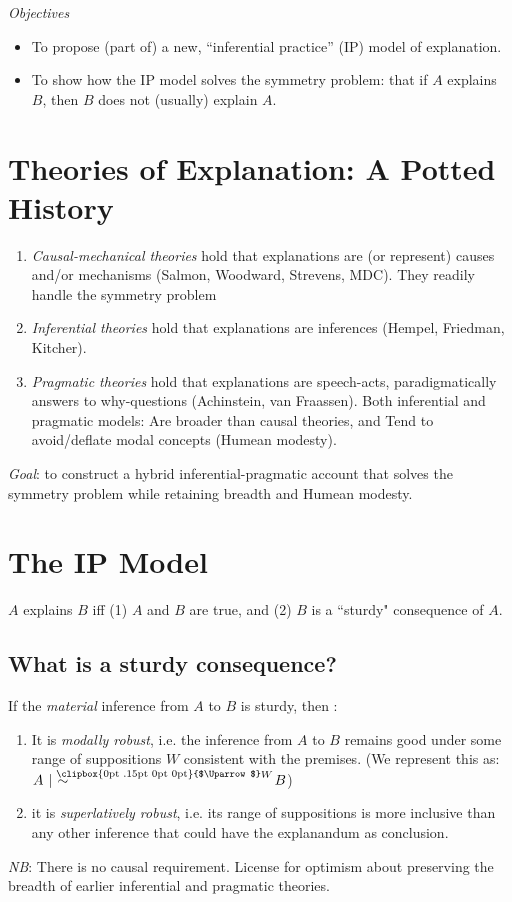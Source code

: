 \documentclass[11pt]{article}
\makeatletter
\newcommand{\Uuparrow}{%
	\raisebox{.2ex}{\clipbox{0pt .15pt 0pt 0pt}{$\Uparrow$}}
}
\newcommand{\nms}{%
	\mathbin{\mathpalette\@nms\expandafter}
}
\newcommand{\@nms}{\mid\joinrel\mkern-.5mu\sim}
\newcommand{\mrc}[1]{\mathbin{
		\mathchoice
		{\normalsize\hspace{.5mm}\nms^{\mkern-19mu\scriptsize\Uuparrow#1}\hspace{-.5mm}}
		{\normalsize\hspace{.5mm}\nms^{\mkern-19mu\scriptsize\Uuparrow#1}\hspace{-.5mm}}
		{\footnotesize\hspace{.5mm}\nms^{\mkern-13.5mu\fontsize{5.5}{0}\Uuparrow#1}}
		{\scriptsize\nms^{\mkern-10mu\tiny\Uuparrow#1}}
	}
}
\makeatother
\begin{document}
\textit{Objectives}
\begin{itemize}
\item To propose (part of) a new, ``inferential practice” (IP) model of explanation.
\item To show how the IP model solves the symmetry problem: that if $A$ explains $B$, then $B$ does not (usually) explain $A$.
\end{itemize}

\section{Theories of Explanation: A Potted History}
\begin{enumerate}
\item \textit{Causal-mechanical theories} hold that explanations are (or represent) causes and/or mechanisms (Salmon, Woodward, Strevens, MDC).
\subitem They readily handle the symmetry problem
\item \textit{Inferential theories} hold that explanations are inferences (Hempel, Friedman, Kitcher).
\item \textit{Pragmatic theories} hold that explanations are speech-acts, paradigmatically answers to why-questions (Achinstein, van Fraassen). Both inferential and pragmatic models:
\subitem Are broader than causal theories, and
\subitem Tend to avoid/deflate modal concepts (Humean modesty).
\end{enumerate}
\textit{Goal}: to construct a hybrid inferential-pragmatic account that solves the symmetry problem while retaining breadth and Humean modesty.

\section{The IP Model}
$A$ explains $B$ iff (1) $A$ and $B$ are true, and (2) $B$ is a ``sturdy" consequence of $A$.

\subsection{What is a sturdy consequence?}
If the \textit{material} inference from $A$ to $B$ is sturdy, then :
\begin{enumerate}
	\item It is \textit{modally robust}, i.e. the inference from $A$ to $B$ remains good under some range of suppositions $W$ consistent with the premises. (We represent this as: $A \mrc{W} B$)
	\item it is \textit{superlatively robust}, i.e. its range of suppositions is more inclusive than any other inference that could have the explanandum as conclusion.
\end{enumerate}
\textit{NB}: There is no causal requirement. License for optimism about preserving the breadth of earlier inferential and pragmatic theories. \newline
\end{document}
